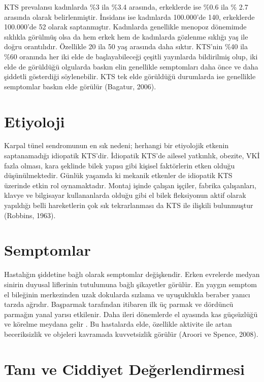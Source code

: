 \documentclass[12pt,twoside]{deuthesis}
\begin{document}
KTS prevalansı kadınlarda \%3 ila \%3.4 arasında, erkeklerde ise \%0.6 ila \% 2.7 arasında olarak
belirlenmiştir. İnsidans ise kadınlarda 100.000'de 140, erkeklerde 100.000'de 52 olarak saptanmıştır.
Kadınlarda genellikle menopoz dönemimde sıklıkla görülmüş olsa da hem erkek hem de kadınlarda
gözlenme sıklığı yaş ile doğru orantılıdır. Özellikle 20 ila 50 yaş arasında daha sıktır. KTS'nin \%40 ila \%60 oranında her iki elde de başlayabileceği çeşitli yayınlarda bildirilmiş olup, iki elde de görüldüğü olgularda baskın elin genellikle semptomları daha önce ve daha şiddetli gösterdiği söylenebilir. KTS tek elde görüldüğü durumlarda ise genellikle semptomlar baskın elde görülür (Bagatur, 2006).

\hypertarget{KTSEtiyoloji}{%
\section{Etiyoloji}\label{KTSEtiyoloji}}

Karpal tünel sendromunun en sık nedeni; herhangi bir etiyolojik etkenin saptanamadığı idiopatik KTS'dir. İdiopatik KTS'de ailesel yatkınlık, obezite, VKİ fazla olması, kara şeklinde bilek yapısı gibi
kişisel faktörlerin etken olduğu düşünülmektedir. Günlük yaşamda ki mekanik etkenler de idiopatik KTS
üzerinde etkin rol oynamaktadır. Montaj işinde çalışan işçiler, fabrika çalışanları, klavye ve bilgisayar
kullananlarda olduğu gibi el bilek fleksiyonun aktif olarak yapıldığı belli hareketlerin çok sık
tekrarlanması da KTS ile ilişkili bulunmuştur (Robbins, 1963).

\hypertarget{KTSSemptom}{%
\section{Semptomlar}\label{KTSSemptom}}

Hastalığın şiddetine bağlı olarak semptomlar değişkendir. Erken evrelerde medyan sinirin duyusal
liflerinin tutulumuna bağlı şikayetler görülür. En yaygın semptom el bileğinin merkezinden uzak
dokularda sızlama ve uyuşuklukla beraber yanıcı tarzda ağrıdır. Başparmak tarafından itibaren ilk üç
parmak ve dördüncü parmağın yanal yarısı etkilenir. Daha ileri dönemlerde el ayasında kas
güçsüzlüğü ve körelme meydana gelir . Bu hastalarda elde, özellikle aktivite ile artan beceriksizlik ve objeleri kavramada kuvvetsizlik görülür (Aroori ve Spence, 2008).

\hypertarget{KTSTani_Ciddi}{%
\section{Tanı ve Ciddiyet Değerlendirmesi}\label{KTSTani_Ciddi}}
\end{document}
